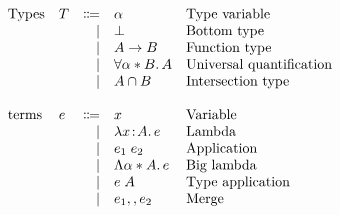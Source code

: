 \documentclass[preprint]{sigplanconf}
\begin{document}
\begin{figure}
  \[
  \begin{array}{l}
    \begin{array}{llrll}
      \text{Types}
      & T & \Coloneqq & \alpha     & \text{Type variable} \\
      &         & \mid & \bot            & \text{Bottom type} \\
      &        & \mid & A \to B         & \text{Function type}\\
      &         & \mid & \forall \alpha * B.\, A   & \text{Universal quantification} \\
      &         & \mid & A \cap B  & \text{Intersection type} \\

      \\
      \text{terms}
      & e & \Coloneqq & x            & \text{Variable} \\
      &   & \mid & \lambda x \!:\! A.\, e        & \text{Lambda} \\
      &   & \mid & e_1 \; e_2  & \text{Application} \\
      &   & \mid & \Lambda \alpha * A.\, e    & \text{Big lambda} \\
      &   & \mid & e \; A         & \text{Type application} \\
      &   & \mid &  e_1 ,, e_2 & \text{Merge} \\


\end{array}
\end{array}\]
\end{figure}
\end{document}
